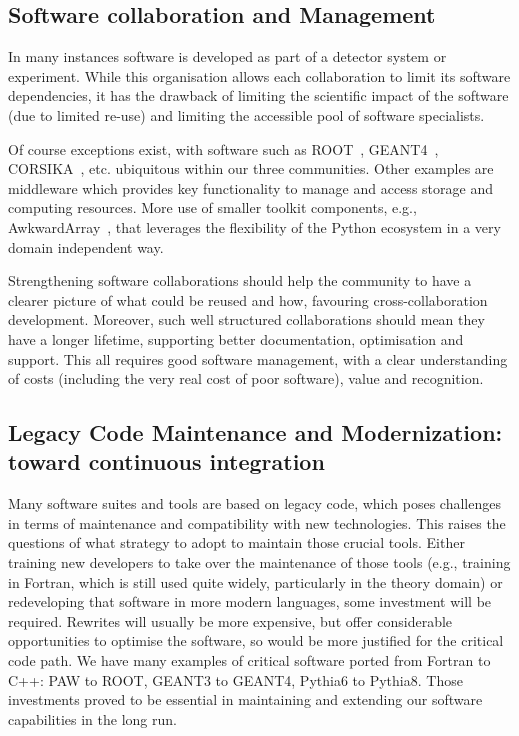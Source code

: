 \subsection{Software collaboration and Management}


In many instances software is developed as part of a detector system or experiment. While this organisation allows each collaboration to limit its software dependencies, it has the drawback of limiting the scientific impact of the software (due to limited re-use) and limiting the accessible pool of software specialists.

Of course exceptions exist, with software such as ROOT~\cite{Brun1996}, GEANT4~\cite{Agostinelli2003}, CORSIKA~\cite{Heck:1998vt}, etc. ubiquitous within our three communities. Other examples are middleware which provides key functionality to manage and access storage and computing resources. More use of smaller toolkit components, e.g., AwkwardArray~\cite{Pivarski_Awkward_Array_2018}, that leverages the flexibility of the Python ecosystem in a very domain independent way.

Strengthening software collaborations should help the community to have a clearer picture of what could be reused and how, favouring cross-collaboration development. Moreover, such well structured collaborations should mean they have a longer lifetime, supporting better documentation, optimisation and support. This all requires good software management, with a clear understanding of costs (including the very real cost of poor software), value and recognition.


\subsection{Legacy Code Maintenance and Modernization: toward continuous integration}

Many software suites and tools are based on legacy code, which poses challenges in terms of maintenance and compatibility with new technologies. This raises the questions of what strategy to adopt to maintain those crucial tools. Either training new developers to take over the maintenance of those tools (e.g., training in Fortran, which is still used quite widely, particularly in the theory domain) or redeveloping that software in more modern languages, some investment will be required. Rewrites will usually be more expensive, but offer considerable opportunities to optimise the software, so would be more justified for the critical code path. We have many examples of critical software ported from Fortran to C++: PAW to ROOT, GEANT3 to GEANT4, Pythia6 to Pythia8. Those investments proved to be essential in maintaining and extending our software capabilities in the long run.

